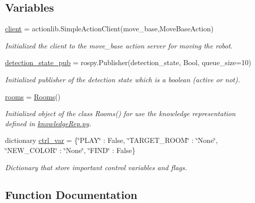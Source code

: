 \subsection*{Variables}
\begin{DoxyCompactItemize}
\item 
\hyperlink{namespacecmdManager_ad1967c9cd71b2174a9b4c56d32f08fcc}{client} = actionlib.\+Simple\+Action\+Client(\textquotesingle{}move\+\_\+base\textquotesingle{},Move\+Base\+Action)
\begin{DoxyCompactList}\small\item\em Initialized the client to the move\+\_\+base action server for moving the robot. \end{DoxyCompactList}\item 
\hyperlink{namespacecmdManager_a441b40512edb5f87f3aede896640f5b4}{detection\+\_\+state\+\_\+pub} = rospy.\+Publisher(\textquotesingle{}detection\+\_\+state\textquotesingle{}, Bool, queue\+\_\+size=10)
\begin{DoxyCompactList}\small\item\em Initialized publisher of the detection state which is a boolean (active or not). \end{DoxyCompactList}\item 
\hyperlink{namespacecmdManager_a783b0ef84682af39dc9f2b8e828c4ad9}{rooms} = \hyperlink{classknowledgeRep_1_1Rooms}{Rooms}()
\begin{DoxyCompactList}\small\item\em Initialized object of the class Rooms() for use the knowledge representation defined in \hyperlink{knowledgeRep_8py}{knowledge\+Rep.\+py}. \end{DoxyCompactList}\item 
dictionary \hyperlink{namespacecmdManager_a927e4211865b745599afe42e9e8d7c8e}{ctrl\+\_\+var} = \{\char`\"{}P\+L\+AY\char`\"{} \+: False, \char`\"{}T\+A\+R\+G\+E\+T\+\_\+\+R\+O\+OM\char`\"{} \+: \char`\"{}None\char`\"{}, \char`\"{}N\+E\+W\+\_\+\+C\+O\+L\+OR\char`\"{} \+: \char`\"{}None\char`\"{}, \char`\"{}F\+I\+ND\char`\"{} \+: False\}
\begin{DoxyCompactList}\small\item\em Dictionary that store important control variables and flags. \end{DoxyCompactList}\end{DoxyCompactItemize}


\subsection{Function Documentation}
